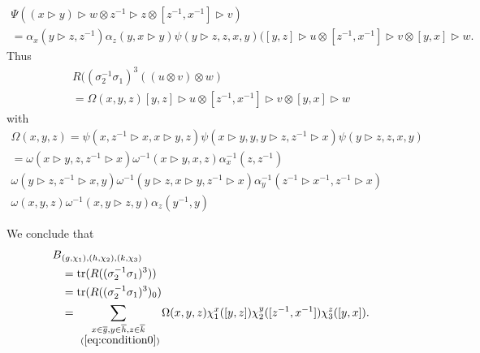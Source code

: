 \documentclass[11pt]{book}
\theoremstyle{Rem}
\theoremstyle{definition}
\numberwithin{equation}{section}
\newcommand\ol[1]{\overline{#1}}
\newcommand\tr{\operatorname{tr}}
\newcommand\hit{\triangleright}
\newcommand\inv{^{-1}}
\newcommand\ot{\otimes}
\begin{document}
\begin{multline*}
\Psi((x\hit y)\hit w\ot z\inv\hit z\ot[z\inv,x\inv]\hit v) \\
  =\alpha_x(y\hit z, z\inv)\alpha_z(y, x\hit y)\psi(y\hit z,z,x,y)([y,z]\hit u\ot [z\inv,x\inv]\hit v\ot[y,x]\hit w.
\end{multline*}
Thus
\begin{multline*}
  R((\sigma_2\inv\sigma_1)^3((u\ot v)\ot w)\\
  =\Omega(x,y,z)[y,z]\hit u\ot[z\inv,x\inv]\hit v\ot [y,x]\hit w
\end{multline*}
with
\begin{multline}\label{omega}
\Omega(x,y,z)=\psi(x,z\inv\hit x,x\hit y,z)\psi(x\hit y,y,y\hit z,z\inv\hit x)\psi(y\hit z,z,x,y)\\
  =\omega(x\hit y,z,z\inv\hit x)\omega\inv(x\hit y,x,z)\alpha_x\inv(z,z\inv)\\
  \omega(y\hit z,z\inv\hit x,y)\omega\inv(y\hit z,x\hit y,z\inv\hit x)\alpha_y\inv(z\inv\hit x\inv,z\inv\hit x)\\
  \omega(x,y,z)\omega\inv(x,y\hit z,y)\alpha_z(y\inv,y)
\end{multline}

We conclude that
\begin{align*}
  B&_{(g,\chi_1),(h,\chi_2),(k,\chi_3)}\\&=\tr(R((\sigma_2\inv\sigma_1)^3))\\
  &=\tr(R((\sigma_2\inv\sigma_1)^3)_0)\\
  &=\sum_{\substack{x\in\ol g,y\in\ol h,z\in\ol k\\~(\cref{eq:condition0})}}\Omega(x,y,z)\chi_1^x([y,z])\chi_2^y([z\inv,x\inv])\chi_3^z([y,x]).
\end{align*}
\end{document}
